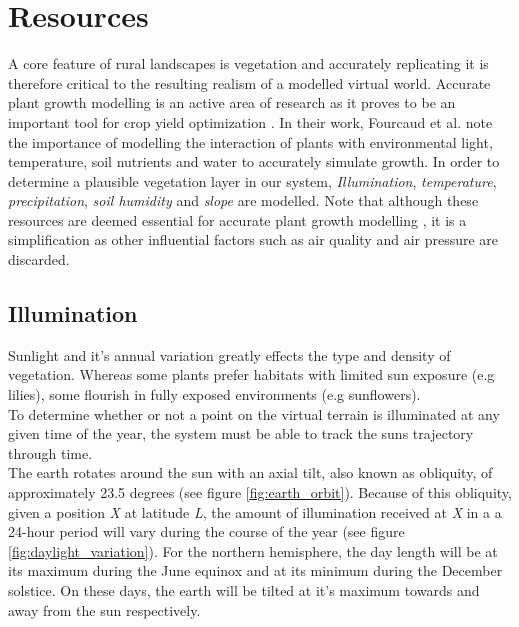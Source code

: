 \section{Resources}

A core feature of rural landscapes is vegetation and accurately replicating it is therefore critical to the resulting realism of a modelled virtual world. Accurate plant growth modelling is an active area of research as it proves to be an important tool for crop yield optimization \cite{Fourcaud2008}. In their work, Fourcaud et al. \cite{Fourcaud2008} note the importance of modelling the interaction of plants with environmental light, temperature, soil nutrients and water to accurately simulate growth. In order to determine a plausible vegetation layer in our system, \textit{Illumination}, \textit{temperature}, \textit{precipitation}, \textit{soil humidity} and \textit{slope} are modelled. Note that although these resources are deemed essential for accurate plant growth modelling \cite{Fourcaud2008}, it is a simplification as other influential factors such as air quality and air pressure are discarded.\\

\subsection{Illumination}

Sunlight and it's annual variation greatly effects the type and density of vegetation. Whereas some plants prefer habitats with limited sun exposure (e.g lilies), some flourish in fully exposed environments (e.g sunflowers). \\
To determine whether or not a point on the virtual terrain is illuminated at any given time of the year, the system must be able to track the suns trajectory through time.\\

The earth rotates around the sun with an axial tilt, also known as obliquity, of approximately 23.5 degrees (see figure \ref{fig:earth_orbit}). Because of this obliquity, given a position \textit{X} at latitude \textit{L}, the amount of illumination received at \textit{X} in a a 24-hour period will vary during the course of the year (see figure \ref{fig:daylight_variation}). For the northern hemisphere, the day length will be at its maximum during the June equinox and at its minimum during the December solstice. On these days, the earth will be tilted at it's maximum towards and away from the sun respectively.\\

